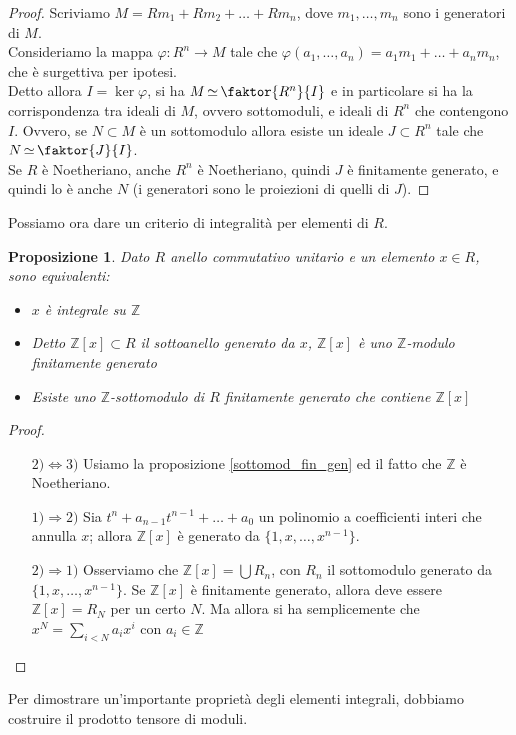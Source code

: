 \documentclass[11pt]{article}
\theoremstyle{plain}
\newtheorem{prop}[thm]{Proposizione}
\theoremstyle{definition}
\theoremstyle{remark}
\newcommand{\Z}{\mathbb{Z}}
\DeclareMathOperator{\iso}{\simeq}
\begin{document}
  \begin{proof}
   Scriviamo $M=Rm_1+Rm_2+\dots+Rm_n$, dove $m_1,\dots,m_n$ sono i generatori di $M$.\\
   Consideriamo la mappa $\varphi:R^n\to M$ tale che $\varphi(a_1,\dots,a_n)=a_1m_1+\dots+a_nm_n$, che è surgettiva per ipotesi.\\
   Detto allora $I=\ker\varphi$, si ha $M\iso\faktor{R^n}{I}$ e in particolare si ha la corrispondenza tra ideali di $M$, ovvero sottomoduli, e ideali di $R^n$ che contengono $I$.
   Ovvero, se $N\subset M$ è un sottomodulo allora esiste un ideale $J\subset R^n$ tale che $N\iso\faktor{J}{I}$.\\
   Se $R$ è Noetheriano, anche $R^n$ è Noetheriano, quindi $J$ è finitamente generato, e quindi lo è anche $N$ (i generatori sono le proiezioni di quelli di $J$).
  \end{proof}
  Possiamo ora dare un criterio di integralità per elementi di $R$.
  \begin{prop}\label{crit_integ}
   Dato $R$ anello commutativo unitario e un elemento $x\in R$, sono equivalenti:
   \begin{itemize}
    \item $x$ è integrale su $\Z$
    \item Detto $\Z[x]\subset R$ il sottoanello generato da $x$, $\Z[x]$ è uno $\Z$-modulo finitamente generato
    \item Esiste uno $\Z$-sottomodulo di $R$ finitamente generato che contiene $\Z[x]$
   \end{itemize}
  \end{prop}
  \begin{proof}
   \begin{itemize}
    \item[$2)\iff 3)$] Usiamo la proposizione \ref{sottomod_fin_gen} ed il fatto che $\Z$ è Noetheriano.
    \item[$1)\Rightarrow2)$] Sia $t^n+a_{n-1}t^{n-1}+\dots+a_0$ un polinomio a coefficienti interi che annulla $x$; allora $\Z[x]$ è generato da $\{1,x,\dots,x^{n-1}\}$.
    \item[$2)\Rightarrow1)$] Osserviamo che $\Z[x]=\bigcup R_n$, con $R_n$ il sottomodulo generato da $\{1,x,\dots,x^{n-1}\}$. Se $\Z[x]$ è finitamente generato, allora deve essere $\Z[x]=R_N$ per un certo $N$.
    Ma allora si ha semplicemente che $x^N=\sum_{i<N}a_ix^i$ con $a_i\in\Z$
   \end{itemize}
  \end{proof}
  Per dimostrare un'importante proprietà degli elementi integrali, dobbiamo costruire il prodotto tensore di moduli.\\
\end{document}
